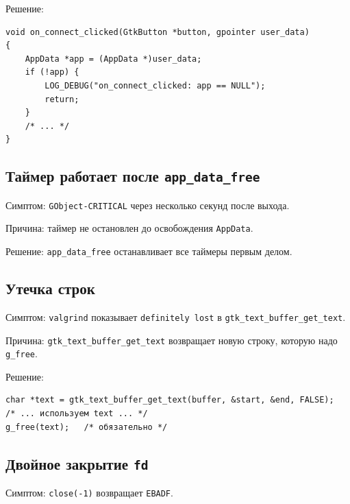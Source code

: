 Решение:

\begin{listing}[htbp]
\begin{verbatim}
void on_connect_clicked(GtkButton *button, gpointer user_data)
{
    AppData *app = (AppData *)user_data;
    if (!app) {
        LOG_DEBUG("on_connect_clicked: app == NULL");
        return;
    }
    /* ... */
}
\end{verbatim}
\caption{Проверка \texttt{user\_data}}
\label{lst:debug-null-check}
\end{listing}

\subsection{Таймер работает после \texttt{app\_data\_free}}

Симптом: \texttt{GObject-CRITICAL} через
несколько секунд после выхода.

Причина: таймер не остановлен до
освобождения \texttt{AppData}.

Решение: \texttt{app\_data\_free} останавливает
все таймеры первым делом.

\subsection{Утечка строк}

Симптом: \texttt{valgrind} показывает
\texttt{definitely lost} в \texttt{gtk\_text\_buffer\_get\_text}.

Причина: \texttt{gtk\_text\_buffer\_get\_text} возвращает
новую строку, которую надо \texttt{g\_free}.

Решение:

\begin{listing}[htbp]
\begin{verbatim}
char *text = gtk_text_buffer_get_text(buffer, &start, &end, FALSE);
/* ... используем text ... */
g_free(text);   /* обязательно */
\end{verbatim}
\caption{Освобождение строки из \texttt{GtkTextBuffer}}
\label{lst:debug-free-string}
\end{listing}

\subsection{Двойное закрытие \texttt{fd}}

Симптом: \texttt{close(-1)} возвращает \texttt{EBADF}.

